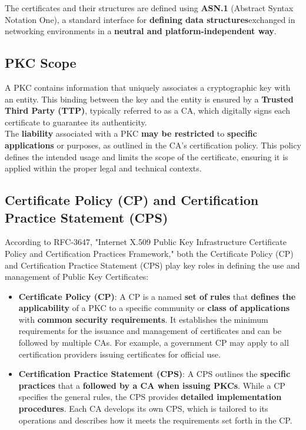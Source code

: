 The certificates and their structures are defined using \textbf{ASN.1}
(Abstract Syntax Notation One), a standard interface for
\textbf{defining data structures}exchanged in networking environments
in a \textbf{neutral and platform-independent way}. 

\subsection{PKC Scope}
A PKC contains information that uniquely associates a cryptographic
key with an entity. This binding between the key and the entity is
ensured by a \textbf{Trusted Third Party (TTP)}, typically referred to
as a CA, which digitally signs each certificate to guarantee its
authenticity.\\

The \textbf{liability} associated with a PKC \textbf{may be
restricted} to \textbf{specific applications} or purposes, as outlined
in the CA's certification policy. This policy defines the intended
usage and limits the scope of the certificate, ensuring it is applied
within the proper legal and technical contexts.

\subsection{Certificate Policy (CP) and Certification Practice
Statement (CPS)}

According to RFC-3647, "Internet X.509 Public Key Infrastructure
Certificate Policy and Certification Practices Framework," both the
Certificate Policy (CP) and Certification Practice Statement (CPS)
play key roles in defining the use and management of Public Key
Certificates:

\begin{itemize}
  \item \textbf{Certificate Policy (CP)}: A CP is a named \textbf{set
    of rules}
    that \textbf{defines the applicability} of a PKC to a specific
    community or \textbf{class of applications} with \textbf{common
    security requirements}. It establishes the minimum requirements
    for the issuance and management of certificates and can be
    followed by multiple CAs. For example, a government CP may apply
    to all certification providers issuing certificates for official
    use.

  \item \textbf{Certification Practice Statement (CPS)}: A CPS
    outlines the \textbf{specific practices} that a \textbf{followed
    by a CA when issuing PKCs}. While a CP specifies the general
    rules, the CPS provides \textbf{detailed implementation
    procedures}. Each CA develops its own CPS, which is tailored to
    its operations and describes how it meets the requirements set
    forth in the CP.
\end{itemize}

